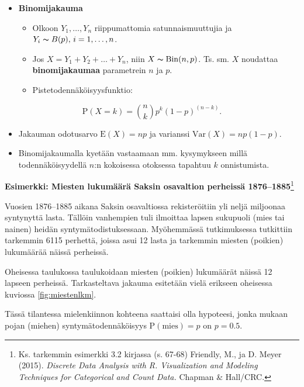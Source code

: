 \documentclass[
]{book}
\providecommand{\tightlist}{%
  \setlength{\itemsep}{0pt}\setlength{\parskip}{0pt}}
\begin{document}
\hfill\break

\begin{itemize}
\tightlist
\item
  \textbf{Binomijakauma}

  \begin{itemize}
  \tightlist
  \item
    Olkoon \(Y_1, \ldots, Y_n\) riippumattomia satunnaismuuttujia ja \(Y_i \thicksim B(p), \, i=1,\ldots,n\).
  \item
    Jos \(X = Y_1 + Y_2 + \ldots + Y_n\), niin \(X \thicksim \mathrm{Bin}(n,p)\). Ts. sm. \(X\) noudattaa \textbf{binomijakaumaa} parametrein \(n\) ja \(p\).
  \item
    Pistetodennäköisyysfunktio:
  \end{itemize}
\end{itemize}

\[
\text{P}(X=k) = \binom nk p^k (1-p)^{(n-k)}.
\]

\begin{itemize}
\tightlist
\item
  Jakauman odotusarvo \(\text{E}(X)=np\) ja varianssi \(\mathrm{Var}(X) = n p (1-p)\).
\item
  Binomijakaumalla kyetään vastaamaan mm. kysymykseen millä todennäköisyydellä \(n\):n kokoisessa otoksessa tapahtuu \(k\) onnistumista.
\end{itemize}

\begin{eblock}{}
\textbf{Esimerkki: Miesten lukumäärä Saksin osavaltion perheissä 1876--1885}\footnote{Ks. tarkemmin esimerkki 3.2 kirjassa (s. 67-68) Friendly, M., ja D. Meyer (2015). \emph{Discrete Data Analysis with R. Visualization and Modeling Techniques for Categorical and Count Data.} Chapman \& Hall/CRC.}

Vuosien 1876--1885 aikana Saksin osavaltiossa rekisteröitiin yli neljä miljoonaa syntynyttä lasta. Tällöin vanhempien tuli ilmoittaa lapsen sukupuoli (mies tai nainen) heidän syntymätodistuksessaan. Myöhemmässä tutkimuksessa tutkittiin tarkemmin 6115 perhettä, joissa asui 12 lasta ja tarkemmin miesten (poikien) lukumäärää näissä perheissä.

Oheisessa taulukossa taulukoidaan miesten (poikien) lukumäärät näissä 12 lapseen perheissä. Tarkasteltava jakauma esitetään vielä erikseen oheisessa kuviossa \ref{fig:miestenlkm}.

Tässä tilantessa mielenkiinnon kohteena saattaisi olla hypoteesi, jonka mukaan pojan (miehen) syntymätodennäköisyys \(\text{P}(\mathrm{mies}) = p\) on \(p=0.5\).

\end{eblock}
\end{document}
